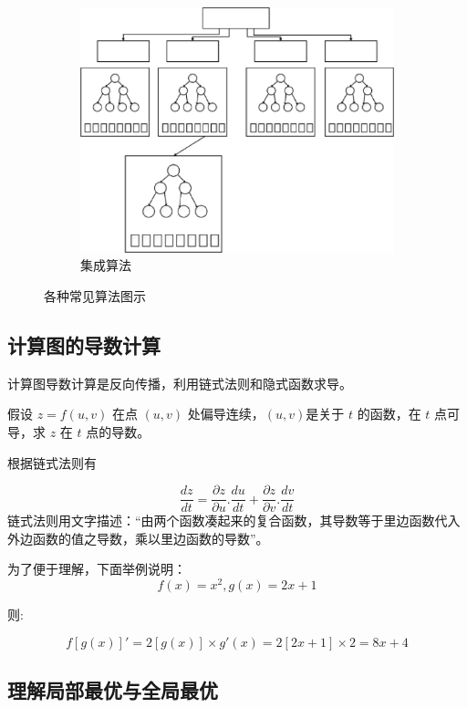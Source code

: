 \begin{figure}[htp]
\begin{subfigure}{.33\textwidth}
	   \includegraphics[width=\linewidth]{imgs/2.2.12.eps}
	   \caption{集成算法}
	   \label{fig:2.sub.12}
	 \end{subfigure}\hfil %

	 \caption{各种常见算法图示}
	 \label{fig:2.2}

 \end{figure}

\subsection{计算图的导数计算}

计算图导数计算是反向传播，利用链式法则和隐式函数求导。

假设 $z = f(u,v)$ 在点 $(u,v)$ 处偏导连续，$(u,v)$是关于 $t$ 的函数，在 $t$ 点可导，求 $z$ 在 $t$ 点的导数。

根据链式法则有

$$
\frac{dz}{dt}=\frac{\partial z}{\partial u}.\frac{du}{dt}+\frac{\partial z}{\partial v} .\frac{dv}{dt}
$$
链式法则用文字描述：``由两个函数凑起来的复合函数，其导数等于里边函数代入外边函数的值之导数，乘以里边函数的导数''。

为了便于理解，下面举例说明：
$$
f(x)=x^2,g(x)=2x+1
$$

则:

$$
{f[g(x)]}'=2[g(x)] \times g'(x)=2[2x+1] \times 2=8x+4
$$

\subsection{理解局部最优与全局最优}

